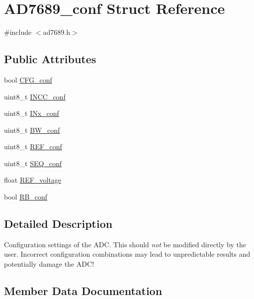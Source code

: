 \hypertarget{struct_a_d7689__conf}{}\section{A\+D7689\+\_\+conf Struct Reference}
\label{struct_a_d7689__conf}


{\ttfamily \#include $<$ad7689.\+h$>$}

\subsection*{Public Attributes}
\begin{DoxyCompactItemize}
\item 
bool \hyperlink{struct_a_d7689__conf_a1bf0a608c2e37f6312f95a3b0c7d5de2}{C\+F\+G\+\_\+conf}
\item 
uint8\+\_\+t \hyperlink{struct_a_d7689__conf_a773712b5b1df5aa0a90b3209a4dc756a}{I\+N\+C\+C\+\_\+conf}
\item 
uint8\+\_\+t \hyperlink{struct_a_d7689__conf_a8445f90255253364698a77196a07ef55}{I\+Nx\+\_\+conf}
\item 
uint8\+\_\+t \hyperlink{struct_a_d7689__conf_a42c57aee2e6630a06ba37995277141f4}{B\+W\+\_\+conf}
\item 
uint8\+\_\+t \hyperlink{struct_a_d7689__conf_a6432ae4a479a0c7d69a26766ced7236a}{R\+E\+F\+\_\+conf}
\item 
uint8\+\_\+t \hyperlink{struct_a_d7689__conf_ab47a25238b90f905090e1c45a464aae6}{S\+E\+Q\+\_\+conf}
\item 
float \hyperlink{struct_a_d7689__conf_afa7cab435f4302f48c7e475ddb500b8b}{R\+E\+F\+\_\+voltage}
\item 
bool \hyperlink{struct_a_d7689__conf_a0b4312f3cfb5bb224e5298c0bff45e85}{R\+B\+\_\+conf}
\end{DoxyCompactItemize}


\subsection{Detailed Description}
Configuration settings of the A\+DC. This should {\itshape not} be modified directly by the user. Incorrect configuration combinations may lead to unpredictable results and potentially damage the A\+D\+C! 

\subsection{Member Data Documentation}
\mbox{\label{struct_a_d7689__conf_a42c57aee2e6630a06ba37995277141f4}} 
